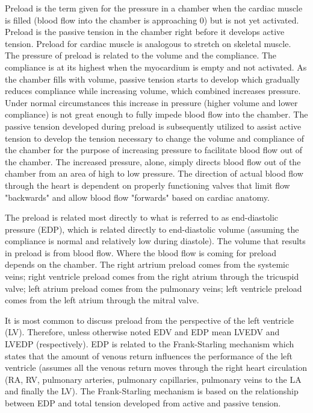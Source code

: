 Preload is the term given for the pressure in a chamber when the cardiac muscle is filled (blood flow into the chamber is approaching 0) but is not yet activated. Preload is the passive tension in the chamber right before it develops active tension. Preload for cardiac muscle is analogous to stretch on skeletal muscle. The pressure of preload is related to the volume and the compliance. The compliance is at its highest when the myocardium is empty and not activated. As the chamber fills with volume, passive tension starts to develop which gradually reduces compliance while increasing volume, which combined increases pressure. Under normal circumstances this increase in pressure (higher volume and lower compliance) is not great enough to fully impede blood flow into the chamber. The passive tension developed during preload is subsequently utilized to assist active tension to develop the tension necessary to change the volume and compliance of the chamber for the purpose of increasing pressure to facilitate blood flow out of the chamber. The increased pressure, alone, simply directs blood flow out of the chamber from an area of high to low pressure. The direction of actual blood flow through the heart is dependent on properly functioning valves that limit flow "backwards" and allow blood flow "forwards" based on cardiac anatomy.

The preload is related most directly to what is referred to as end-diastolic pressure (EDP), which is related directly to end-diastolic volume (assuming the compliance is normal and relatively low during diastole). The volume that results in preload is from blood flow. Where the blood flow is coming for preload depends on the chamber. The right artrium preload comes from the systemic veins; right ventricle preload comes from the right atrium through the tricuspid valve; left atrium preload comes from the pulmonary veins; left ventricle preload comes from the left atrium through the mitral valve. 

It is most common to discuss preload from the perspective of the left ventricle (LV). Therefore, unless otherwise noted EDV and EDP mean LVEDV and LVEDP (respectively). EDP is related to the Frank-Starling mechanism which states that the amount of venous return influences the performance of the left ventricle (assumes all the venous return moves through the right heart circulation (RA, RV, pulmonary arteries, pulmonary capillaries, pulmonary veins to the LA and finally the LV). The Frank-Starling mechanism is based on the relationship between EDP and total tension developed from active and passive tension.

